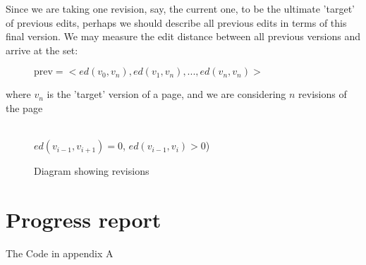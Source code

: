 \documentclass[a4paper,11pt,twoside,notitlepage]{article}
\begin{document}
        Since we are taking one revision, say, the current one, to be
        the ultimate 'target' of previous edits, perhaps we should
        describe all previous edits in terms of this final version. We
        may measure the edit distance between all previous versions
        and arrive at the set:
        
        \begin{figure}[h!]
          \centering
          $\text{prev} = <ed(v_0,v_n),ed(v_1,v_n),...,ed(v_n,v_n)>$  
        \end{figure}
        where $v_n$ is the 'target' version of a page, and we are
        considering $n$ revisions of the page

        \begin{figure}[h!]
          \centering
          \\$ed(v_{i-1},v_{i+1}) = 0$, $ed(v_{i-1},v_{i}) > 0$)
          \caption{Diagram showing revisions}
          \label{fig:awesome_image}
        \end{figure}
        

        \section{Progress report}
        
        The Code in appendix A
\end{document}
